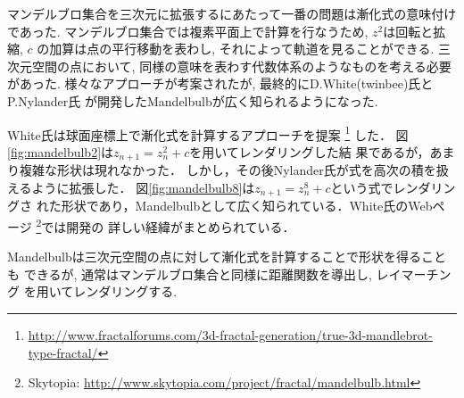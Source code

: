 マンデルブロ集合を三次元に拡張するにあたって一番の問題は漸化式の意味付けであった.
マンデルブロ集合では複素平面上で計算を行なうため, $z^2$は回転と拡縮, $c$
の加算は点の平行移動を表わし, それによって軌道を見ることができる.
三次元空間の点において, 同様の意味を表わす代数体系のようなものを考える必要があった.
様々なアプローチが考案されたが, 最終的にD.White(twinbee)氏とP.Nylander氏
が開発したMandelbulbが広く知られるようになった.

White氏は球面座標上で漸化式を計算するアプローチを提案
\footnote{\url{http://www.fractalforums.com/3d-fractal-generation/true-3d-mandlebrot-type-fractal/}}
した．
図\ref{fig:mandelbulb2}は$z_{n+1} = z_n^2 + c$を用いてレンダリングした結
果であるが，あまり複雑な形状は現れなかった．
しかし，その後Nylander氏が式を高次の積を扱えるように拡張した．
図\ref{fig:mandelbulb8}は$z_{n+1} = z_n^8 + c $という式でレンダリングさ
れた形状であり，Mandelbulbとして広く知られている．White氏のWebページ
\footnote{Skytopia:
\url{http://www.skytopia.com/project/fractal/mandelbulb.html}}では開発の
詳しい経緯がまとめられている．

Mandelbulbは三次元空間の点に対して漸化式を計算することで形状を得ることも
できるが, 通常はマンデルブロ集合と同様に距離関数を導出し, レイマーチング
を用いてレンダリングする.

